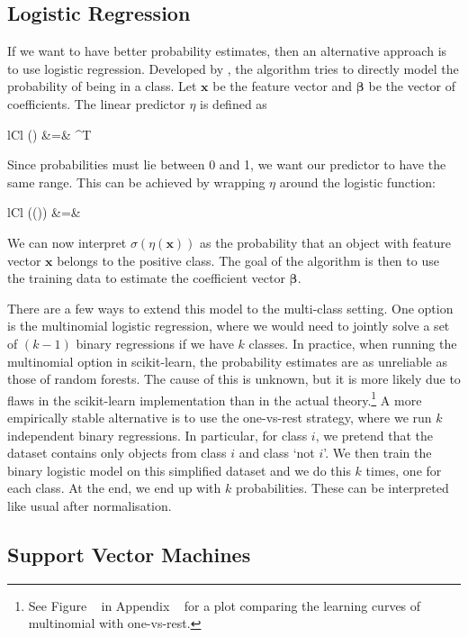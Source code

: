 \subsection{Logistic Regression}
If we want to have better probability estimates, then an alternative approach is to
use logistic regression.
Developed by , the algorithm tries to directly model the probability of 
being in a class. Let $\bm{x}$ be the feature vector and $\bm{\beta}$ be the vector of 
coefficients. The linear predictor $\eta$ is defined as
	\begin{IEEEeqnarray*}{lCl}
		\eta() &=& \bm{\beta}^T 
	\end{IEEEeqnarray*}	
Since probabilities must lie between 0 and 1, we want our predictor to have the same range.
This can be achieved by wrapping $\eta$ around the logistic function:
	\begin{IEEEeqnarray*}{lCl}
		\sigma(\eta()) &=& 
	\end{IEEEeqnarray*}
We can now interpret $\sigma(\eta(\bm{x}))$ as the probability that an object with feature
vector $\bm{x}$ belongs to the positive class. The goal of the algorithm is then to use the
training data to estimate the coefficient vector $\bm{\beta}$.

There are a few ways to extend this model to the multi-class setting. One option is
the multinomial logistic regression, where we would need to jointly solve a set of $(k-1)$ 
binary regressions if we have $k$ classes. In practice, when running the multinomial option
in scikit-learn, the probability estimates are as unreliable as those of random forests.
The cause of this is unknown, but it is more likely due to flaws in the scikit-learn
implementation than in the actual theory.\footnote{See Figure ~ in
	Appendix ~ for a plot comparing the learning curves of multinomial with one-vs-rest.}
A more empirically stable alternative is to use the one-vs-rest strategy, where we run $k$ 
independent binary regressions. In particular, for class $i$, we pretend that the dataset
contains only objects from class $i$ and class `not $i$'. We then train the binary logistic model
on this simplified dataset and we do this $k$ times, one for each class. At the end, we end up
with $k$ probabilities. These can be interpreted like usual after normalisation.


\subsection{Support Vector Machines}

